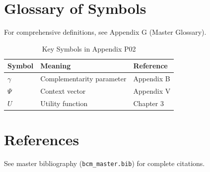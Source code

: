 \section{Glossary of Symbols}
\label{sec:p02-glossary}

For comprehensive definitions, see Appendix G (Master Glossary).

\begin{table}[htbp]
\centering
\caption{Key Symbols in Appendix P02}
\begin{tabular}{lll}
\toprule
\textbf{Symbol} & \textbf{Meaning} & \textbf{Reference} \\
\midrule
$\gamma$ & Complementarity parameter & Appendix B \\
$\Psi$ & Context vector & Appendix V \\
$U$ & Utility function & Chapter 3 \\
\bottomrule
\end{tabular}
\end{table}


\section{References}
\label{sec:p02-references}

See master bibliography (\texttt{bcm\_master.bib}) for complete citations.

\nocite{bcm_master}

